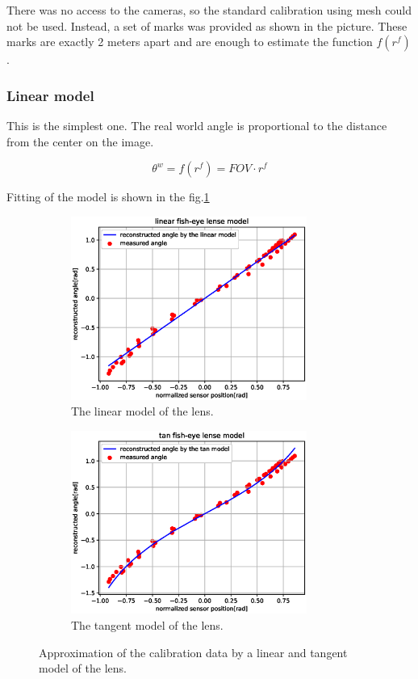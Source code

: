 \documentclass[a4paper,12pt,titlepage, twoside]{article}
\numberwithin{figure}{section}
\begin{document}
There was no access to the cameras, so the standard calibration using mesh could not be used. Instead, a set of marks was provided as shown in the picture. These marks are exactly 2 meters apart and are enough to estimate the function $f(r^f)$.

\subsubsection{Linear model}

This is the simplest one. The real world angle is proportional to the distance from the center on the image. 

\begin{equation}
\theta^w = f(r^f) = FOV \cdot r^f
\end{equation}

Fitting of the model is shown in the fig.\ref{fig:linear_model}

\begin{figure}
    \begin{subfigure}[Sample1]{0.5\linewidth}
        \includegraphics[height=60mm]{fig/linear_model3.eps}
        \caption{The linear model of the lens.}
        \label{fig:linear_model}
    \end{subfigure}
    \qquad
    \begin{subfigure}[Sample1]{0.5\linewidth}    
        \includegraphics[height=60mm]{fig/tan_model2.eps}  
        \caption{The tangent model of the lens.}
        \label{fig:tan_model}
    \end{subfigure} 
    \caption{Approximation of the calibration data by a linear and tangent model of the lens.}
\end{figure}
\end{document}
